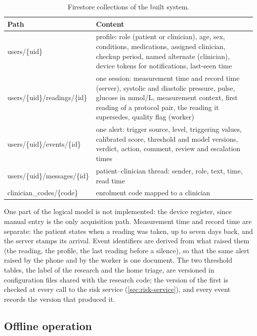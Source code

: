 \begin{table}[htbp]
\centering\footnotesize
\caption{Firestore collections of the built system.}\label{tab:collections}
\begin{tabularx}{\textwidth}{@{}>{\raggedright\arraybackslash\ttfamily\scriptsize}p{4.2cm} X@{}}
\toprule
\normalfont\textbf{Path} & \textbf{Content} \\
\midrule
users/\{uid\} & profile: role (patient or clinician), age, sex, conditions, medications, assigned clinician, checkup period, named alternate (clinician), device tokens for notifications, last-seen time \\
users/\{uid\}/readings/\{id\} & one session: measurement time and record time (server), systolic and diastolic pressure, pulse, glucose in mmol/L, measurement context, first reading of a protocol pair, the reading it supersedes, quality flag (worker) \\
users/\{uid\}/events/\{id\} & one alert: trigger source, level, triggering values, calibrated score, threshold and model versions, verdict, action, comment, review and escalation times \\
users/\{uid\}/messages/\{id\} & patient--clinician thread: sender, role, text, time, read time \\
clinician\_codes/\{code\} & enrolment code mapped to a clinician \\
\bottomrule
\end{tabularx}
\end{table}

One part of the logical model is not implemented: the device register, since manual entry is the only acquisition path. Measurement time and record time are separate: the patient states when a reading was taken, up to seven days back, and the server stamps its arrival. Event identifiers are derived from what raised them (the reading, the profile, the last reading before a silence), so that the same alert raised by the phone and by the worker is one document. The two threshold tables, the label of the research and the home triage, are versioned in configuration files shared with the research code; the version of the first is checked at every call to the risk service (\cref{sec:risk-service}), and every event records the version that produced it.

\subsection{Offline operation}\label{sec:offline-built}

